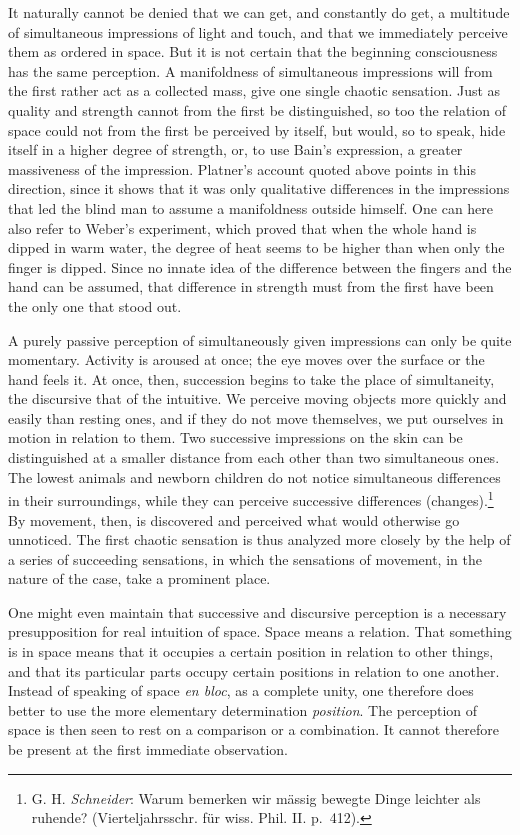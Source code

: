 \documentclass[12pt,a4paper]{book}
\newcommand{\opage}[1]{\marginnote{\footnotesize\textit{[#1]}}}
\begin{document}
It naturally cannot be denied that we can get, and constantly do get, a
multitude of simultaneous impressions of light and touch, and that we
immediately perceive them as ordered in space. But it is not certain that
the beginning consciousness has the same perception. A manifoldness of
simultaneous impressions will from the first rather act as a collected
mass, give one single chaotic
\opage{244}sensation. Just as quality and strength cannot from the first
be distinguished, so too the relation of space could not from the first
be perceived by itself, but would, so to speak, hide itself in a higher
degree of strength, or, to use Bain's expression, a greater massiveness
of the impression. Platner's account quoted above points in this
direction, since it shows that it was only qualitative differences in the
impressions that led the blind man to assume a manifoldness outside
himself. One can here also refer to Weber's experiment, which proved
that when the whole hand is dipped in warm water, the degree of heat
seems to be higher than when only the finger is dipped. Since no innate
idea of the difference between the fingers and the hand can be assumed,
that difference in strength must from the first have been the only one
that stood out.

A purely passive perception of simultaneously given impressions can only
be quite momentary. Activity is aroused at once; the eye moves over the
surface or the hand feels it. At once, then, succession begins to take
the place of simultaneity, the discursive that of the intuitive. We
perceive moving objects more quickly and easily than resting ones, and if
they do not move themselves, we put ourselves in motion in relation to
them. Two successive impressions on the skin can be distinguished at a
smaller distance from each other than two simultaneous ones. The lowest
animals and newborn children do not notice simultaneous differences in
their surroundings, while they can perceive successive differences
(changes).\footnote{G. H. \emph{Schneider}: Warum bemerken wir mässig
bewegte Dinge leichter als ruhende? (Vierteljahrsschr. für wiss. Phil.
II. p.~412).} By movement, then, is discovered and perceived what would
otherwise go unnoticed. The first chaotic sensation is thus analyzed more
closely by the help of a series of succeeding sensations, in which the
sensations of movement, in the nature of the case, take a prominent
place.

One might even maintain that successive and discursive perception is a
necessary presupposition for real intuition of space. Space means a
relation. That something is in space means that it occupies a certain
position in relation to other things, and that its particular parts
occupy certain positions in
\opage{245}relation to one another. Instead of speaking of space
\textit{en bloc}, as a complete unity, one therefore does better to use
the more elementary determination \emph{position}. The perception of
space is then seen to rest on a comparison or a combination. It cannot
therefore be present at the first immediate observation.
\end{document}
